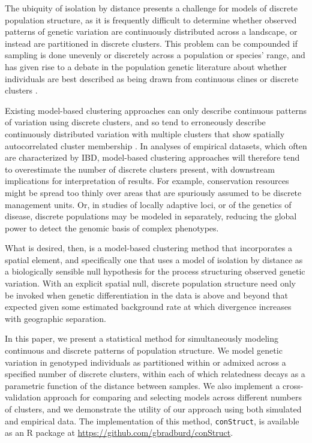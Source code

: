 \documentclass[12pt]{article}
\begin{document}
The ubiquity of isolation by distance presents a challenge for models of discrete population structure,
as it is frequently difficult to determine whether observed patterns of genetic variation are 
continuously distributed across a landscape, or instead are partitioned in discrete clusters.
This problem can be compounded if sampling is done unevenly or discretely across a population or species' range,
and has given rise to a debate in the population genetic literature about whether 
individuals are best described as being drawn from continuous clines or discrete clusters 
\citep[e.g.][]{SerrePaabo2004,rosenberg2005clines}.

Existing model-based clustering approaches can only describe continuous patterns of variation using
discrete clusters, 
and so tend to erroneously describe continuously distributed variation with multiple clusters that 
show spatially autocorrelated cluster membership \citep{Frantz2009,Meirmans2012}.
In analyses of empirical datasets, which often are characterized by IBD,
model-based clustering approaches will therefore tend to overestimate the number of discrete clusters present,
with downstream implications for interpretation of results.
For example, conservation resources might be spread too thinly over areas 
that are spuriously assumed to be discrete management units.
Or, in studies of locally adaptive loci, or of the genetics of disease,
discrete populations may be modeled in separately,
reducing the global power to detect the genomic basis of complex phenotypes.

What is desired, then, is a model-based clustering method that incorporates a spatial element,
and specifically one that uses a model of isolation by distance as a biologically sensible null hypothesis 
for the process structuring observed genetic variation.
With an explicit spatial null, discrete population structure need only be invoked when genetic differentiation 
in the data is above and beyond that expected given some estimated background rate at which divergence 
increases with geographic separation.

In this paper, we present a statistical method for simultaneously 
modeling continuous and discrete patterns of population structure.
We model genetic variation in genotyped individuals as 
partitioned within or admixed across a specified number of discrete clusters,
within each of which relatedness decays as a parametric function of the distance between samples.
We also implement a cross-validation approach for comparing and selecting models across different numbers of clusters,
and we demonstrate the utility of our approach using both simulated and empirical data.
The implementation of this method, \texttt{conStruct}, is available as an R package at 
\href{https://github.com/gbradburd/conStruct}{https://github.com/gbradburd/conStruct}.
\end{document}
